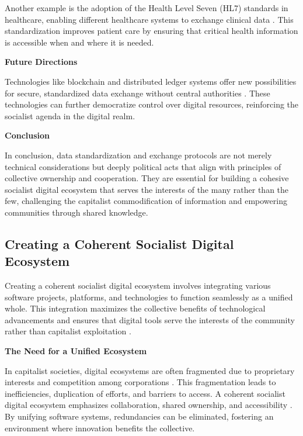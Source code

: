 \begin{refsection}
Another example is the adoption of the Health Level Seven (HL7) standards in healthcare, enabling different healthcare systems to exchange clinical data \cite[pp.~45-47]{Beeler1998}. This standardization improves patient care by ensuring that critical health information is accessible when and where it is needed.

\textbf{Future Directions}

Technologies like blockchain and distributed ledger systems offer new possibilities for secure, standardized data exchange without central authorities \cite[pp.~123]{Tapscott2016}. These technologies can further democratize control over digital resources, reinforcing the socialist agenda in the digital realm.

\textbf{Conclusion}

In conclusion, data standardization and exchange protocols are not merely technical considerations but deeply political acts that align with principles of collective ownership and cooperation. They are essential for building a cohesive socialist digital ecosystem that serves the interests of the many rather than the few, challenging the capitalist commodification of information and empowering communities through shared knowledge.

\subsection{Creating a Coherent Socialist Digital Ecosystem}

Creating a coherent socialist digital ecosystem involves integrating various software projects, platforms, and technologies to function seamlessly as a unified whole. This integration maximizes the collective benefits of technological advancements and ensures that digital tools serve the interests of the community rather than capitalist exploitation \cite[pp.~35-37]{Stallman2010}.

\textbf{The Need for a Unified Ecosystem}

In capitalist societies, digital ecosystems are often fragmented due to proprietary interests and competition among corporations \cite[pp.~45-47]{Fuchs2014}. This fragmentation leads to inefficiencies, duplication of efforts, and barriers to access. A coherent socialist digital ecosystem emphasizes collaboration, shared ownership, and accessibility \cite[pp.~102-105]{Marx2008}. By unifying software systems, redundancies can be eliminated, fostering an environment where innovation benefits the collective.


\end{refsection}
